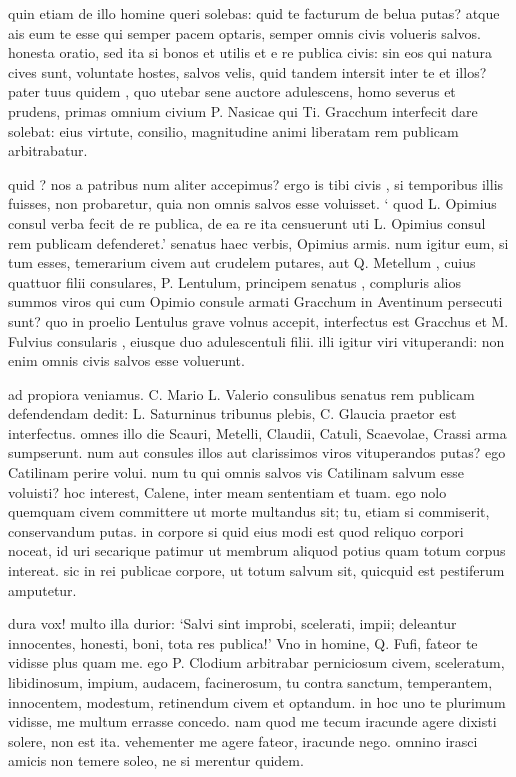  quin etiam de illo homine queri solebas: quid te facturum de belua putas? atque ais eum te esse qui semper pacem optaris, semper omnis civis volueris salvos. honesta oratio, sed ita si bonos et utilis et e re publica civis: sin eos qui natura cives sunt, voluntate hostes, salvos velis, quid tandem intersit inter te et illos? pater tuus quidem , quo utebar sene auctore adulescens, homo severus et prudens, primas omnium civium P. Nasicae qui Ti. Gracchum interfecit dare solebat: eius virtute, consilio, magnitudine animi liberatam rem publicam arbitrabatur.

 quid ? nos a patribus num aliter accepimus? ergo is tibi civis , si temporibus illis fuisses, non probaretur, quia non omnis salvos esse voluisset. ` quod L. Opimius consul verba fecit de re publica, de ea re ita censuerunt uti L. Opimius consul rem publicam defenderet.' senatus haec verbis, Opimius armis. num igitur eum, si tum esses, temerarium civem aut crudelem putares, aut Q. Metellum , cuius quattuor filii consulares, P. Lentulum, principem senatus , compluris alios summos viros qui cum Opimio consule armati Gracchum in Aventinum persecuti sunt? quo in proelio Lentulus grave volnus accepit, interfectus est Gracchus et M. Fulvius consularis , eiusque duo adulescentuli filii. illi igitur viri vituperandi: non enim omnis civis salvos esse voluerunt.

 ad propiora veniamus. C. Mario L. Valerio consulibus senatus rem publicam defendendam dedit: L. Saturninus tribunus plebis, C. Glaucia praetor est interfectus. omnes illo die Scauri, Metelli, Claudii, Catuli, Scaevolae, Crassi arma sumpserunt. num aut consules illos aut clarissimos viros vituperandos putas? ego Catilinam perire volui. num tu qui omnis salvos vis Catilinam salvum esse voluisti? hoc interest, Calene, inter meam sententiam et tuam. ego nolo quemquam civem committere ut morte multandus sit; tu, etiam si commiserit, conservandum putas. in corpore si quid eius modi est quod reliquo corpori noceat, id uri secarique patimur ut membrum aliquod potius quam totum corpus intereat. sic in rei publicae corpore, ut totum salvum sit, quicquid est pestiferum amputetur.

 dura vox! multo illa durior: `Salvi sint improbi, scelerati, impii; deleantur innocentes, honesti, boni, tota res publica!' Vno in homine, Q. Fufi, fateor te vidisse plus quam me. ego P. Clodium arbitrabar perniciosum civem, sceleratum, libidinosum, impium, audacem, facinerosum, tu contra sanctum, temperantem, innocentem, modestum, retinendum civem et optandum. in hoc uno te plurimum vidisse, me multum errasse concedo. nam quod me tecum iracunde agere dixisti solere, non est ita. vehementer me agere fateor, iracunde nego. omnino irasci amicis non temere soleo, ne si merentur quidem.

